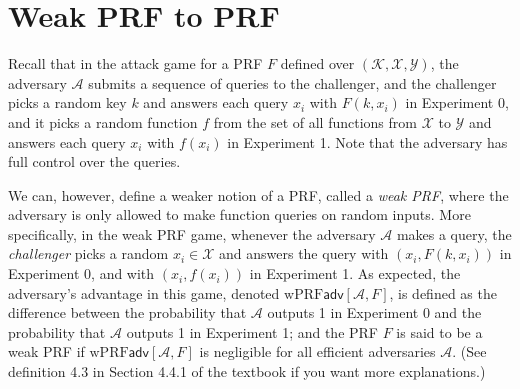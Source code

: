 \documentclass[12pt]{article}
\theoremstyle{definition}
\newcommand{\X}{\mathcal{X}}
\newcommand{\Y}{\mathcal{Y}}
\newcommand{\K}{\mathcal{K}}
\newcommand{\Adv}{\mathcal{A}}
\begin{document}
\section{Weak PRF to PRF}

Recall that in the attack game for a PRF $F$ defined over $(\K, \X, \Y)$,
the adversary $\Adv$ submits a sequence of queries to the challenger, 
and the challenger picks a random key $k$ and answers each query $x_i$ with $F(k, x_i)$ in Experiment 0,
and it picks a random function $f$ from the set of all functions from $\X$ to $\Y$ and answers each query 
$x_i$ with $f(x_i)$ in Experiment 1.
Note that the adversary has full control over the queries.

We can, however, define a weaker notion of a PRF, called a \emph{weak PRF}, 
where the adversary is only allowed to make function queries on random inputs.
More specifically, in the weak PRF game, whenever the adversary $\Adv$ makes a query,
the \emph{challenger} picks a random $x_i \in \X$ and answers the query with $(x_i, F(k, x_i))$ in Experiment 0, 
and with $(x_i, f(x_i))$ in Experiment 1.
As expected, the adversary's advantage in this game, denoted $\mathrm{wPRF}\textsf{adv}[\Adv, F]$, 
is defined as the difference between the probability that $\Adv$ outputs 1 in Experiment 0 and the probability that $\Adv$ outputs 1 in Experiment 1; 
and the PRF $F$ is said to be a weak PRF if $\mathrm{wPRF}\textsf{adv}[\Adv, F]$ is negligible for all 
efficient adversaries $\Adv$. (See definition 4.3 in Section 4.4.1 of the textbook if you want more explanations.)
\end{document}
